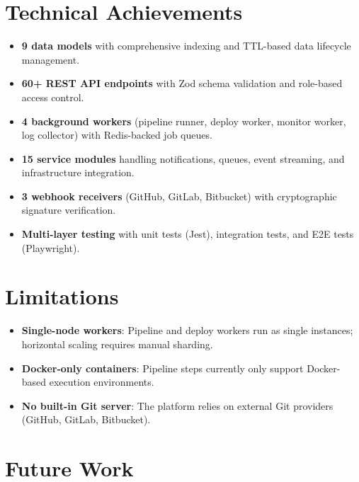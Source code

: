 \documentclass[12pt,a4paper,twoside]{report}
\begin{document}
\section{Technical Achievements}

\begin{itemize}[noitemsep]
  \item \textbf{9 data models} with comprehensive indexing and TTL-based data lifecycle management.
  \item \textbf{60+ REST API endpoints} with Zod schema validation and role-based access control.
  \item \textbf{4 background workers} (pipeline runner, deploy worker, monitor worker, log collector) with Redis-backed job queues.
  \item \textbf{15 service modules} handling notifications, queues, event streaming, and infrastructure integration.
  \item \textbf{3 webhook receivers} (GitHub, GitLab, Bitbucket) with cryptographic signature verification.
  \item \textbf{Multi-layer testing} with unit tests (Jest), integration tests, and E2E tests (Playwright).
\end{itemize}

\section{Limitations}

\begin{itemize}[noitemsep]
  \item \textbf{Single-node workers}: Pipeline and deploy workers run as single instances; horizontal scaling requires manual sharding.
  \item \textbf{Docker-only containers}: Pipeline steps currently only support Docker-based execution environments.
  \item \textbf{No built-in Git server}: The platform relies on external Git providers (GitHub, GitLab, Bitbucket).
\end{itemize}

\section{Future Work}
\end{document}
